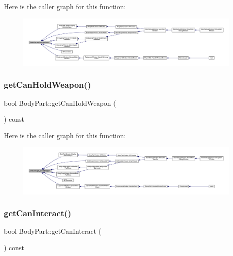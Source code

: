 Here is the caller graph for this function\+:
\nopagebreak
\begin{figure}[H]
\begin{center}
\leavevmode
\includegraphics[width=350pt]{d2/d6f/class_body_part_a0be339561a54fa3dbff4ebc27f4b3c4c_icgraph}
\end{center}
\end{figure}
\mbox{\label{class_body_part_a9982b6e93c9168734960e9f334acdece}} 
\subsubsection{\texorpdfstring{get\+Can\+Hold\+Weapon()}{getCanHoldWeapon()}}
{\footnotesize\ttfamily bool Body\+Part\+::get\+Can\+Hold\+Weapon (\begin{DoxyParamCaption}{ }\end{DoxyParamCaption}) const}

Here is the caller graph for this function\+:
\nopagebreak
\begin{figure}[H]
\begin{center}
\leavevmode
\includegraphics[width=350pt]{d2/d6f/class_body_part_a9982b6e93c9168734960e9f334acdece_icgraph}
\end{center}
\end{figure}
\mbox{\label{class_body_part_a9a53de5a283928eb78986c3195d0f1b9}} 
\subsubsection{\texorpdfstring{get\+Can\+Interact()}{getCanInteract()}}
{\footnotesize\ttfamily bool Body\+Part\+::get\+Can\+Interact (\begin{DoxyParamCaption}{ }\end{DoxyParamCaption}) const}

